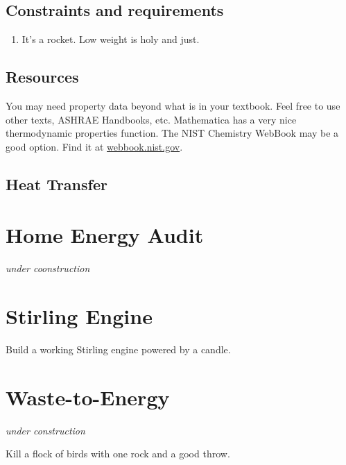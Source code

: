 \documentclass[
]{book}
\providecommand{\tightlist}{%
  \setlength{\itemsep}{0pt}\setlength{\parskip}{0pt}}
\begin{document}
\hypertarget{constraints-and-requirements}{%
\section{Constraints and requirements}\label{constraints-and-requirements}}

\begin{enumerate}
\def\labelenumi{\arabic{enumi}.}
\tightlist
\item
  It's a rocket. Low weight is holy and just.
\end{enumerate}

\hypertarget{resources}{%
\section{Resources}\label{resources}}

You may need property data beyond what is in your textbook. Feel free to use other texts, ASHRAE Handbooks, etc. Mathematica has a very nice thermodynamic properties function. The NIST \citep{linstrom_nist_2019} Chemistry WebBook may be a good option. Find it at \url{webbook.nist.gov}.

\hypertarget{heat-transfer}{%
\section{Heat Transfer}\label{heat-transfer}}

\hypertarget{home-energy-audit}{%
\chapter{Home Energy Audit}\label{home-energy-audit}}

\emph{under coonstruction}

\hypertarget{stirling-engine}{%
\chapter{Stirling Engine}\label{stirling-engine}}

Build a working Stirling engine powered by a candle.

\hypertarget{waste-to-energy}{%
\chapter{Waste-to-Energy}\label{waste-to-energy}}

\emph{under construction}

Kill a flock of birds with one rock and a good throw.
\end{document}
